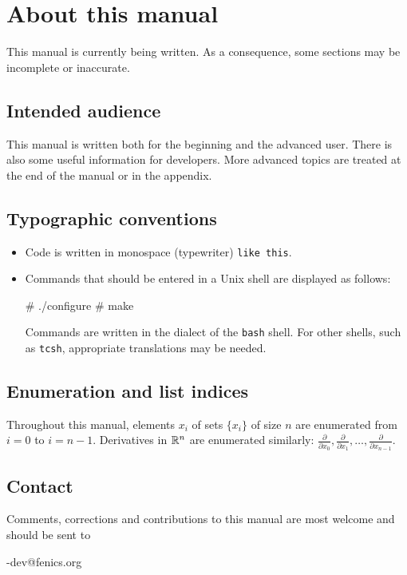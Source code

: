 
\chapter*{About this manual}

This manual is currently being written. As a consequence, some sections
may be incomplete or inaccurate.

\section*{Intended audience}

This manual is written both for the beginning and the advanced user.
There is also some useful information for developers. More advanced topics
are treated at the end of the manual or in the appendix.

\section*{Typographic conventions}

\begin{itemize}
\item
  Code is written in monospace (typewriter) \texttt{like this}.
\item
  Commands that should be entered in a Unix shell
  are displayed as follows:
  \begin{code}
    # ./configure
    # make
  \end{code}
  Commands are written in the dialect of the \texttt{bash} shell. For
  other shells, such as \texttt{tcsh}, appropriate translations may be
  needed.
\end{itemize}

\section*{Enumeration and list indices}

Throughout this manual, elements $x_i$ of sets $\{x_i\}$ of size $n$
are enumerated from $i = 0$ to $i = n-1$. Derivatives in $\mathbb{R}^n$ are
enumerated similarly:
$\frac{\partial}{\partial x_0}, \frac{\partial}{\partial x_1},
 \ldots, \frac{\partial}{\partial x_{n-1}}$.

\section*{Contact}

Comments, corrections and contributions to this manual are most welcome
and should be sent to
\begin{code}
  \packagett{}-dev@fenics.org    
\end{code}
